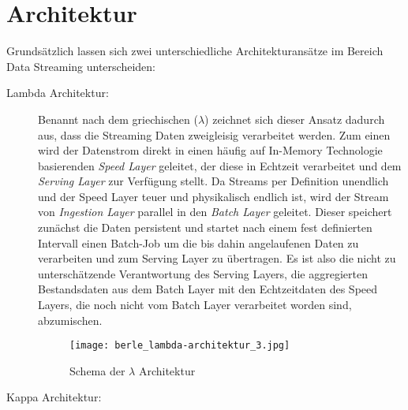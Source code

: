 \section{Architektur}
\label{sec:arch}
Grundsätzlich lassen sich zwei unterschiedliche Architekturansätze im Bereich Data Streaming unterscheiden:

\begin{description}
\item [Lambda Architektur:] Benannt nach dem griechischen ($\lambda$) zeichnet sich dieser Ansatz dadurch aus, dass die Streaming Daten zweigleisig verarbeitet werden. Zum einen wird der Datenstrom direkt in einen häufig auf In-Memory Technologie basierenden \textit{Speed Layer} geleitet, der diese in Echtzeit verarbeitet und dem \textit{Serving Layer} zur Verfügung stellt. Da Streams per Definition unendlich und der Speed Layer teuer und physikalisch endlich ist, wird der Stream von \textit{Ingestion Layer} parallel in den \textit{Batch Layer} geleitet. Dieser speichert zunächst die Daten persistent und startet nach einem fest definierten Intervall einen Batch-Job um die bis dahin angelaufenen Daten zu verarbeiten und zum Serving Layer zu übertragen. Es ist also die nicht zu unterschätzende  Verantwortung des Serving Layers, die aggregierten Bestandsdaten aus dem Batch Layer mit den Echtzeitdaten des Speed Layers, die noch nicht vom Batch Layer verarbeitet worden sind, abzumischen.

\begin{figure}[h]
	\centering
	\texttt{[image: berle\_lambda-architektur\_3.jpg]}
	\caption[Schema der $\lambda$ Architektur]{Schema der $\lambda$ Architektur\citep{TODO}}
	\label{fig:KafkaArchitecture}
\end{figure}


\item [Kappa Architektur:]

\end{description}





